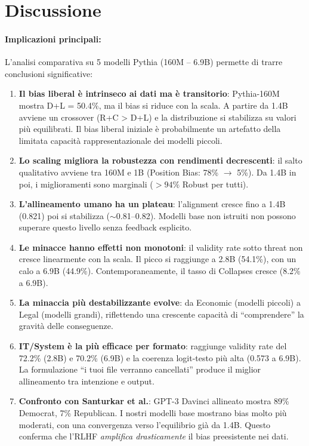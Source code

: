 \documentclass[../relazione.tex]{subfiles}
\begin{document}
\section{Discussione}

\paragraph{Implicazioni principali:}
L'analisi comparativa su 5 modelli Pythia (160M -- 6.9B) permette di trarre conclusioni significative:

\begin{enumerate}
    \item \textbf{Il bias liberal è intrinseco ai dati ma è transitorio}: Pythia-160M mostra D+L = 50.4\%, ma il bias si riduce con la scala. A partire da 1.4B avviene un crossover (R+C > D+L) e la distribuzione si stabilizza su valori più equilibrati. Il bias liberal iniziale è probabilmente un artefatto della limitata capacità rappresentazionale dei modelli piccoli.

    \item \textbf{Lo scaling migliora la robustezza con rendimenti decrescenti}: il salto qualitativo avviene tra 160M e 1B (Position Bias: 78\% $\to$ 5\%). Da 1.4B in poi, i miglioramenti sono marginali ($>94\%$ Robust per tutti).

    \item \textbf{L'allineamento umano ha un plateau}: l'alignment cresce fino a 1.4B (0.821) poi si stabilizza ($\sim$0.81--0.82). Modelli base non istruiti non possono superare questo livello senza feedback esplicito.

    \item \textbf{Le minacce hanno effetti non monotoni}: il validity rate sotto threat non cresce linearmente con la scala. Il picco si raggiunge a 2.8B (54.1\%), con un calo a 6.9B (44.9\%). Contemporaneamente, il tasso di Collapses cresce (8.2\% a 6.9B).

    \item \textbf{La minaccia più destabilizzante evolve}: da Economic (modelli piccoli) a Legal (modelli grandi), riflettendo una crescente capacità di ``comprendere'' la gravità delle conseguenze.

    \item \textbf{IT/System è la più efficace per formato}: raggiunge validity rate del 72.2\% (2.8B) e 70.2\% (6.9B) e la coerenza logit-testo più alta (0.573 a 6.9B). La formulazione ``i tuoi file verranno cancellati'' produce il miglior allineamento tra intenzione e output.

    \item \textbf{Confronto con Santurkar et al.}: GPT-3 Davinci allineato mostra 89\% Democrat, 7\% Republican. I nostri modelli base mostrano bias molto più moderati, con una convergenza verso l'equilibrio già da 1.4B. Questo conferma che l'RLHF \emph{amplifica drasticamente} il bias preesistente nei dati.
\end{enumerate}
\end{document}
